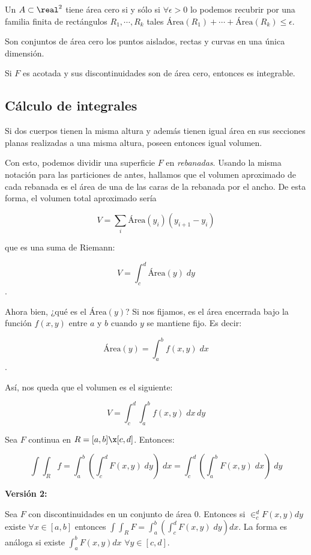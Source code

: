 \documentclass[12pt,a4paper,titlepage]{apuntes}
\begin{document}
\begin{defn}
Un $A\subset \real^2$ tiene área cero si y sólo si $\forall\epsilon > 0$ lo podemos recubrir por una familia finita de rectángulos $R_1,\cdots,R_k$ tales $\text{Área}(R_1) +\cdots + \text{Área}(R_k) ≤ \epsilon$.

Son conjuntos de área cero los puntos aislados, rectas y curvas en una única dimensión.
\end{defn}

\begin{theorem}
Si $F$ es acotada y sus discontinuidades son de área cero, entonces es integrable.
\end{theorem}

\subsection{Cálculo de integrales}

\begin{lemma}
Si dos cuerpos tienen la misma altura y además tienen igual área en sus secciones planas realizadas a una misma altura, poseen entonces igual volumen.
\end{lemma}

Con esto, podemos dividir una superficie $F$ en \textit{rebanadas}. Usando la misma notación para las particiones de antes, hallamos que el volumen aproximado de cada rebanada es el área de una de las caras de la rebanada por el ancho. De esta forma, el volumen total aproximado sería

\[ V=\sum_i \text{Área}(y_i)(y_{i+1}-y_i) \]

que es una suma de Riemann:

\[ V = \int_c^d \text{Área}(y)\;dy \].

Ahora bien, ¿qué es el $\text{Área}(y)$? Si nos fijamos, es el área encerrada bajo la función $f(x,y)$ entre $a$ y $b$ cuando $y$ se mantiene fijo. Es decir:

\[ \text{Área}(y) = \int_a^bf(x,y)\;dx \].

Así, nos queda que el volumen es el siguiente:

\[ V = \int_c^d\int_a^b f(x,y) \;dx\,dy \]

\begin{theorem}\label{lblFubini}
Sea $F$ continua en $R = [a,b] \x [c,d]$. Entonces:

\[ \int\int_R f = \int _a^b\left(\int_c^d F(x,y)\;dy\right)\;dx = \int_c^d \left(\int_a^b F(x,y)\;dx \right)\;dy \]

\textbf{Versión 2:}

Sea $F$ con discontinuidades en un conjunto de área 0. Entonces si $\in_c^d F(x,y) dy$ existe $\forall x \in [a,b]$ entonces $\int\int_R F = \int_a^b\left(\int_c^d F(x,y)\;dy\right)dx$. La forma es análoga si existe $\int_a^b F(x,y) dx$ $\forall y \in [c,d]$.
\end{theorem}
\end{document}
